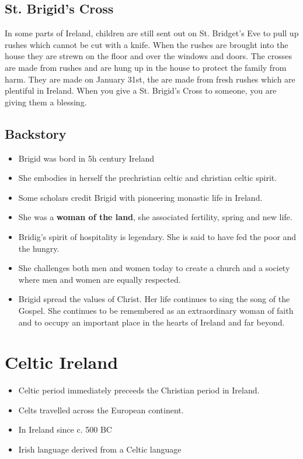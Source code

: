 \documentclass[a4paper]{article}
\begin{document}
\subsection{St. Brigid's Cross}

In some parts of Ireland, children are still sent out on St. Bridget's Eve to pull up rushes which cannot be cut with a knife.
When the rushes are brought into the house they are strewn on the floor and over the windows and doors.
The crosses are made from rushes and are hung up in the house to protect the family from harm. They are made on January 31st, the are made from fresh rushes which are plentiful in Ireland.
When you give a St. Brigid's Cross to someone, you are giving them a blessing.

\subsection{Backstory}



\begin{itemize}
    \item Brigid was bord in 5h century Ireland
    \item She embodies in herself the prechristian celtic and christian celtic spirit. 
    \item Some scholars credit Brigid with pioneering monastic life in Ireland. 
    \item She was a \textbf{woman of the land}, she associated fertility, spring and new life.
    \item Bridig's spirit of hospitality is legendary. She is said to have fed the poor and the hungry.
    \item She challenges both men and women today to create a church and a society where men and women are equally respected.
    \item Brigid spread the values of Christ. Her life continues to sing the song of the Gospel. She continues to be remembered as an extraordinary woman of faith and to occupy an important place in the hearts of Ireland and far beyond.
\end{itemize}

\section{Celtic Ireland}

\begin{itemize}
    \item Celtic period immediately preceeds the Christian period in Ireland.
    \item Celts travelled across the European continent.
    \item In Ireland since c. 500 BC 
    \item Irish language derived from a Celtic language
\end{itemize}
\end{document}
